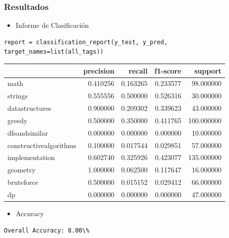 \documentclass{article}
\begin{document}
\subsubsection{Resultados}
\begin{itemize}
    \item Informe de Clasificación
\end{itemize}

\begin{verbatim}
report = classification_report(y_test, y_pred, target_names=list(all_tags))
\end{verbatim}

\begin{tabular}{lrrrr}
    \toprule
                           & precision & recall   & f1-score & support    \\
    \midrule
    math                   & 0.410256  & 0.163265 & 0.233577 & 98.000000  \\
    strings                & 0.555556  & 0.500000 & 0.526316 & 30.000000  \\
    datastructures         & 0.900000  & 0.209302 & 0.339623 & 43.000000  \\
    greedy                 & 0.500000  & 0.350000 & 0.411765 & 100.000000 \\
    dfsandsimilar          & 0.000000  & 0.000000 & 0.000000 & 10.000000  \\
    constructivealgorithms & 0.100000  & 0.017544 & 0.029851 & 57.000000  \\
    implementation         & 0.602740  & 0.325926 & 0.423077 & 135.000000 \\
    geometry               & 1.000000  & 0.062500 & 0.117647 & 16.000000  \\
    bruteforce             & 0.500000  & 0.015152 & 0.029412 & 66.000000  \\
    dp                     & 0.000000  & 0.000000 & 0.000000 & 47.000000  \\
    \bottomrule
\end{tabular}

\begin{itemize}
    \item Accuracy
\end{itemize}
\begin{verbatim}
Overall Accuracy: 8.00\%
\end{verbatim}
\end{document}

